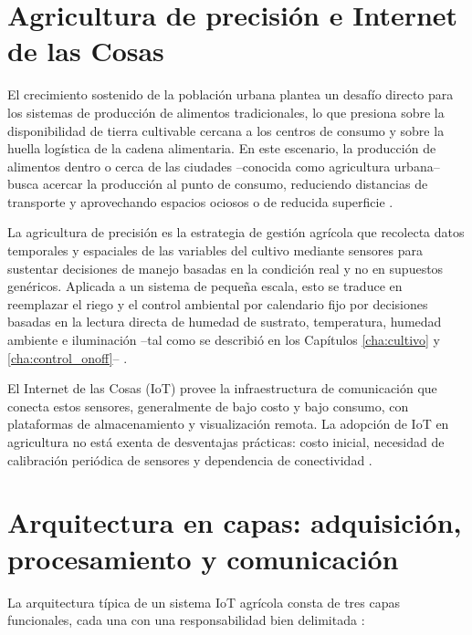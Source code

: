 \section{Agricultura de precisión e Internet de las Cosas}
\label{sec:agricultura_precision}

El crecimiento sostenido de la población urbana plantea un desafío directo para los sistemas de producción de alimentos tradicionales, lo que presiona sobre la disponibilidad de tierra cultivable cercana a los centros de consumo y sobre la huella logística de la cadena alimentaria. En este escenario, la producción de alimentos dentro o cerca de las ciudades --conocida como agricultura urbana-- busca acercar la producción al punto de consumo, reduciendo distancias de transporte y aprovechando espacios ociosos o de reducida superficie \cite{fao_urbanizacion}.

La agricultura de precisión es la estrategia de gestión agrícola que recolecta datos temporales y espaciales de las variables del cultivo mediante sensores para sustentar decisiones de manejo basadas en la condición real y no en supuestos genéricos. Aplicada a un sistema de pequeña escala, esto se traduce en reemplazar el riego y el control ambiental por calendario fijo por decisiones basadas en la lectura directa de humedad de sustrato, temperatura, humedad ambiente e iluminación --tal como se describió en los Capítulos \ref{cha:cultivo} y \ref{cha:control_onoff}-- \cite{agricultura_precision_def}.

El Internet de las Cosas (IoT) provee la infraestructura de comunicación que conecta estos sensores, generalmente de bajo costo y bajo consumo, con plataformas de almacenamiento y visualización remota. La adopción de IoT en agricultura no está exenta de desventajas prácticas: costo inicial, necesidad de calibración periódica de sensores y dependencia de conectividad \cite{iot_agricola_rmic, iot_desafios}.

\section{Arquitectura en capas: adquisición, procesamiento y comunicación}
\label{sec:arquitectura_capas}

La arquitectura típica de un sistema IoT agrícola consta de tres capas funcionales, cada una con una responsabilidad bien delimitada \cite{tzounis2017internet}:

